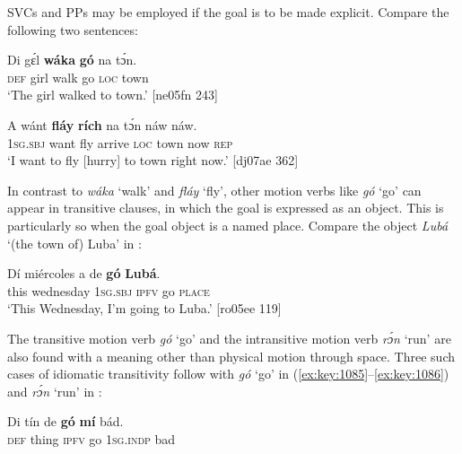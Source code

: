 \z

SVCs and PPs may be employed if the goal is to be made explicit. Compare the following two sentences:


\ea%
    \label{ex:key:1082}
    \gll Di  gɛ́l    \textbf{wáka}  \textbf{gó}  na  tɔ́n.\\
\textsc{def}  girl    walk  go  \textsc{loc}  town\\

\glt ‘The girl walked to town.’ [ne05fn 243]
\z


\ea%
    \label{ex:key:1083}
    \gll A    wánt  \textbf{fláy}  \textbf{rích}    na  tɔ́n   náw    náw.\\
\textsc{1sg.sbj}  want  fly  arrive  \textsc{loc}  town  now    \textsc{rep}\\

\glt ‘I want to fly [hurry] to town right now.’ [dj07ae 362]
\z

In contrast to \textit{wáka} ‘walk’ and \textit{fláy} ‘fly’, other motion verbs like \textit{gó} ‘go’ can appear in transitive clauses, in which the goal is expressed as an object. This is particularly so when the goal object is a named place. Compare the object \textit{Lubá} ‘(the town of) Luba’ in :


\ea%
    \label{ex:key:1084}
    \gll Dí  miércoles  a      de  \textbf{gó}  \textbf{Lubá}.\\
this  wednesday  \textsc{1sg.sbj}    \textsc{ipfv}  go  \textsc{place}\\

\glt ‘This Wednesday, I’m going to Luba.’ [ro05ee 119]
\z

\newpage 
The transitive motion verb \textit{gó} ‘go’ and the intransitive motion verb \textit{rɔ́n} ‘run’ are also found with a meaning other than physical motion through space. Three such cases of idiomatic transitivity follow with \textit{gó} ‘go’ in (\ref{ex:key:1085}–\ref{ex:key:1086}) and \textit{rɔ́n} ‘run’ in :


\ea%
    \label{ex:key:1085}
    \gll Di  tín    de  \textbf{gó}  \textbf{mí}    bád.\\
\textsc{def}  thing  \textsc{ipfv}  go  \textsc{1sg.indp}  bad\\

